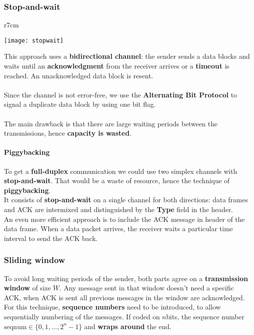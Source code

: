 \subsubsection{Stop-and-wait}
\begin{wrapfigure}[14]{r}{7cm}
	\vspace{-1cm}
	\begin{center}
		\texttt{[image: stopwait]}
	\end{center}
\end{wrapfigure}
This approach uses a \textbf{bidirectional channel}: the sender sends a data blocks and waits until an \textbf{acknowledgment} from the receiver arrives or a \textbf{timeout} is reached. An unacknowledged data block is resent.\\\\
Since the channel is not error-free, we use the \textbf{Alternating Bit Protocol} to signal a duplicate data block by using one bit flag.\\\\
The main drawback is that there are large waiting periods between the transmissions, hence \textbf{capacity is wasted}.

\paragraph{Piggybacking}
To get a \textbf{full-duplex} communication we could use two simplex channels with \textbf{stop-and-wait}. That would be a waste of resource, hence the technique of \textbf{piggybacking}.\\
It consists of \textbf{stop-and-wait} on a single channel for both directions: data frames and ACK are intermixed and distinguished by the \textbf{Type} field in the header.\\
An even more efficient approach is to include the ACK message in header of the data frame. When a data packet arrives, the receiver waits a particular time interval to send the ACK back.

\begin{figure}[!h]
	\hfil
	\hfil
\end{figure}

\subsubsection{Sliding window}
To avoid long waiting periods of the sender, both parts agree on a \textbf{transmission window} of size $W$. Any message sent in that window doesn't need a specific ACK, when ACK is sent all previous messages in the window are acknowledged.\\
For this technique, \textbf{sequence numbers} need to be introduced, to allow sequentially numbering of the messages. If coded on $n$bits, the sequence number $\text{seqnum} \in \{0, 1, \ldots, 2^n-1\}$ and \textbf{wraps around} the end.

